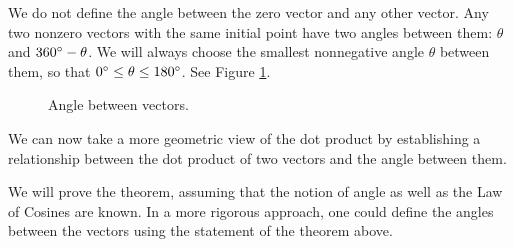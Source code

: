 We do not define the angle between the zero vector and any other vector.
Any two nonzero vectors with the same initial point have two angles between them: $\theta$ and $360^\circ - \theta$.
We will always choose the smallest nonnegative angle $\theta$ between them, so that $0^\circ \leq \theta \leq
180^\circ$. See Figure \ref{fig:angle}.

\begin{figure}[h]
 \centering
 \qquad
 \qquad
 \caption[]{\quad Angle between vectors.}
 \label{fig:angle}
\end{figure}

We can now take a more geometric view of
the dot product by establishing a relationship between the dot product of two vectors and the angle between them.


We will prove the theorem, assuming that the notion of angle as well as the Law of Cosines are known.
In a more rigorous approach, one could define the angles between the vectors using the statement of the theorem above.


